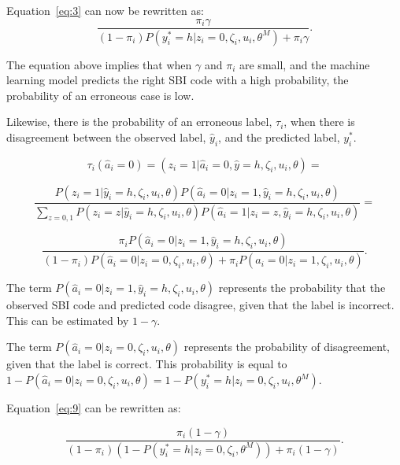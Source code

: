 \documentclass[12pt, a4paper, titlepage]{article}
\begin{document}
Equation~\ref{eq:3} can now be rewritten as:
						\begin{equation}\label{eq:6}
\frac{\pi_i \gamma}{(1-\pi_i)P(y^*_i = h | z_i = 0, \zeta_i, u_i, \theta^M) + \pi_i \gamma  }.
						\end{equation}

The equation above implies that when $\gamma$ and $\pi_i$ are small, and the machine learning model predicts the right SBI code with a high probability, the probability of an erroneous case is low.

Likewise, there is the probability of an erroneous label, $\tau_i$, when there is disagreement between the observed label, $\hat{y}_i$,  and the predicted label, $y^*_i$. 

						\begin{equation}\label{eq:7}
\tau_i(\hat{a}_i = 0) = (z_i = 1 | \hat{a}_i = 0, \hat{y} = h, \zeta_i, u_i, \theta) = 
						\end{equation}

						\begin{equation}\label{eq:8}
\frac{P(z_i = 1|\hat{y}_i = h, \zeta_i, u_i, \theta) P(\hat{a}_i=0|z_i=1, \hat{y}_i = h, \zeta_i, u_i, \theta) }
{\sum_{z=0,1}P(z_i=z|\hat{y}_i = h, \zeta_i, u_i, \theta) P( \hat{a}_i=1|z_i=z, \hat{y}_i = h, \zeta_i, u_i, \theta  )} =
						\end{equation}

						\begin{equation}\label{eq:9}
\frac{\pi_i P(\hat{a}_i=0|z_i=1, \hat{y}_i = h, \zeta_i, u_i, \theta) }
{(1-\pi_i)P(\hat{a}_i = 0 | z_i = 0, \zeta_i, u_i, \theta) + \pi_i P(\hat{a}_i = 0 | z_i = 1, \zeta_i, u_i, \theta) } .
						\end{equation}

The term $P(\hat{a}_i= 0|z_i = 1, \hat{y}_i = h, \zeta_i, u_i, \theta)$ represents the probability that the observed SBI code and predicted code disagree, given that the label is incorrect. This can be estimated by $1-\gamma$.

The term $P(\hat{a}_i = 0 | z_i = 0, \zeta_i, u_i, \theta)$ represents the probability of disagreement, given that the label is correct. This probability is equal to $1 - P(\hat{a}_i = 0 | z_i = 0, \zeta_i, u_i, \theta) = 1 - P(y^*_i = h | z_i = 0, \zeta_i, u_i, \theta^M)$. 

Equation~\ref{eq:9} can be rewritten as:

						\begin{equation}\label{eq:10}
\frac{\pi_i (1-\gamma)}{(1-\pi_i)(1-P(y^*_i = h | z_i = 0, \zeta_i, \theta^M)) + \pi_i (1-\gamma)}   .
						\end{equation}
\end{document}
